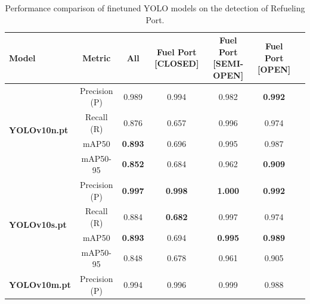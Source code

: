 \documentclass[12pt,oneside]{book} %
\begin{document}
\begin{table}[H]
    \centering
    \caption{Performance comparison of finetuned YOLO models on the detection of Refueling Port.}
    \begin{adjustbox}{max width=\textwidth}
        \begin{tabular}{lcccccc}
            \toprule
            \textbf{Model}                        & \textbf{Metric} & \textbf{All}   & \textbf{Fuel Port [CLOSED]} & \textbf{Fuel Port [SEMI-OPEN]} & \textbf{Fuel Port [OPEN]} \\
            \midrule
            \multirow{4}{*}{\textbf{YOLOv10n.pt}} & Precision (P)   & 0.989          & 0.994                       & 0.982                          & \textbf{0.992}            \\
                                                  & Recall (R)      & 0.876          & 0.657                       & 0.996                          & 0.974                     \\
                                                  & mAP50           & \textbf{0.893} & 0.696                       & 0.995                          & 0.987                     \\
                                                  & mAP50-95        & \textbf{0.852} & 0.684                       & 0.962                          & \textbf{0.909}            \\
            \midrule
            \multirow{4}{*}{\textbf{YOLOv10s.pt}} & Precision (P)   & \textbf{0.997} & \textbf{0.998}              & \textbf{1.000}                 & \textbf{0.992}            \\
                                                  & Recall (R)      & 0.884          & \textbf{0.682}              & 0.997                          & 0.974                     \\
                                                  & mAP50           & \textbf{0.893} & 0.694                       & \textbf{0.995}                 & \textbf{0.989}            \\
                                                  & mAP50-95        & 0.848          & 0.678                       & 0.961                          & 0.905                     \\
            \midrule
            \multirow{4}{*}{\textbf{YOLOv10m.pt}} & Precision (P)   & 0.994          & 0.996                       & 0.999                          & 0.988                     \\

\end{tabular}
\end{adjustbox}
\end{table}
\end{document}
